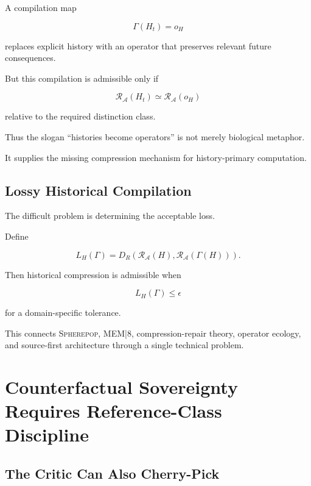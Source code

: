 \documentclass[11pt]{article}
\theoremstyle{remark}
\newcommand{\MEM}{\textsc{MEM|8}}
\newcommand{\Spherepop}{\textsc{Spherepop}}
\newcommand{\Adm}{\mathcal{A}}
\newcommand{\Reach}{\mathcal{R}}
\begin{document}
A compilation map

\begin{equation}
\Gamma(H_t)=o_H
\end{equation}

replaces explicit history with an operator that preserves relevant future consequences.

But this compilation is admissible only if

\begin{equation}
\Reach_{\Adm}(H_t)
\simeq
\Reach_{\Adm}(o_H)
\end{equation}

relative to the required distinction class.

Thus the slogan ``histories become operators'' is not merely biological metaphor.

It supplies the missing compression mechanism for history-primary computation.

\subsection{Lossy Historical Compilation}

The difficult problem is determining the acceptable loss.

Define

\begin{equation}
L_H(\Gamma)
=
D_R
\left(
\Reach_{\Adm}(H),
\Reach_{\Adm}(\Gamma(H))
\right).
\end{equation}

Then historical compression is admissible when

\begin{equation}
L_H(\Gamma)\leq\epsilon
\end{equation}

for a domain-specific tolerance.

This connects \Spherepop{}, \MEM{}, compression-repair theory, operator ecology, and source-first architecture through a single technical problem.

\section{Counterfactual Sovereignty Requires Reference-Class Discipline}

\subsection{The Critic Can Also Cherry-Pick}
\end{document}
